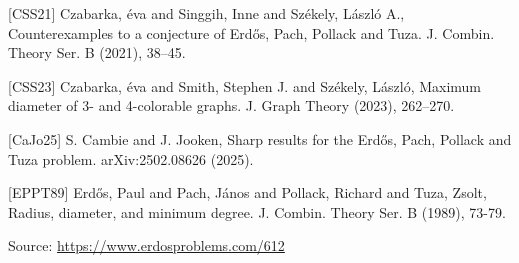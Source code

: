 \documentclass{article}
\begin{document}
 [CSS21] Czabarka, \'{e}va and Singgih, Inne and Sz\'{e}kely, L\'{a}szl\'{o}{}
A., Counterexamples to a conjecture of {E}rd\H{o}s, {P}ach,
{P}ollack and Tuza. J. Combin. Theory Ser. B (2021), 38--45.
 
 [CSS23] Czabarka, \'{e}va and Smith, Stephen J. and Sz\'{e}kely,
L\'{a}szl\'{o}, Maximum diameter of 3- and 4-colorable graphs. J. Graph Theory (2023), 262--270.
 
 [CaJo25] S. Cambie and J. Jooken, Sharp results for the Erd\H{o}s, Pach, Pollack and Tuza problem. arXiv:2502.08626 (2025).
 
 [EPPT89] Erd\H{o}s, Paul and Pach, J\'{a}nos and Pollack, Richard and Tuza, Zsolt, Radius, diameter, and minimum degree. J. Combin. Theory Ser. B (1989), 73-79.

\bigskip
\noindent\small{Source: \url{https://www.erdosproblems.com/612}}
\end{document}
